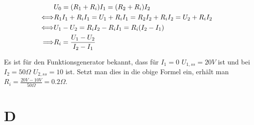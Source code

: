 \begin{align*}
	&U_0 = (R_1 + R_i) I_1 = (R_2 + R_i) I_2\\
	\Longleftrightarrow& R_1 I_1 + R_i I_1 = U_1 + R_i I_1 = R_2 I_2 + R_i I_2 = U_2 + R_i I_2\\
	\Longleftrightarrow& U_1 - U_2 = R_i I_2 - R_i I_1 = R_i (I_2 - I_1)\\
	\Longrightarrow& R_i = \frac{U_1 - U_2}{I_2 - I_1}
\end{align*}

Es ist für den Funktionsgenerator bekannt, dass für $I_1 = 0$ $U_{1, ss} = 20V$ ist und bei $I_2 = 50\Omega$ $U_{2, ss} = 10$ ist. Setzt man dies in die obige Formel ein, erhält man $R_i = \frac{20V - 10V}{50\Omega} = 0.2\Omega$.


\section{D}





